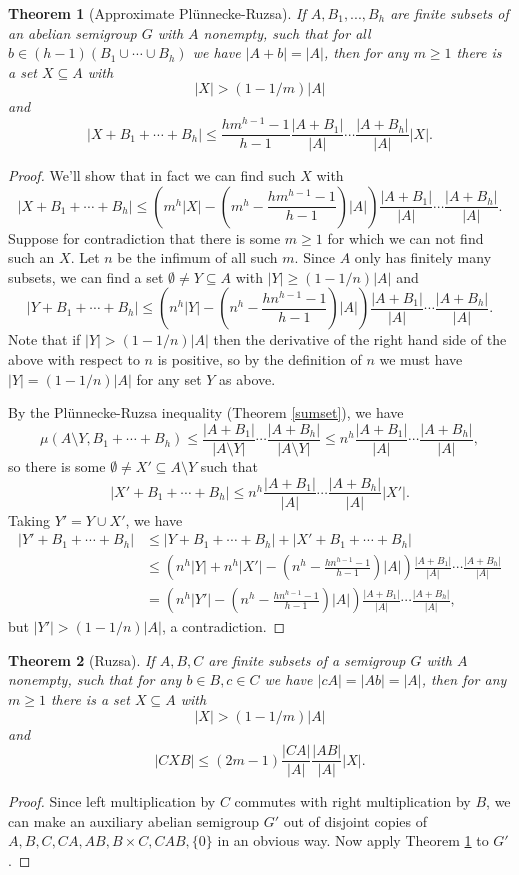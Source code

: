 \documentclass[letterpaper,11pt]{article}
\newtheorem{thm}{Theorem}
\theoremstyle{definition}
\theoremstyle{remark}
\begin{document}
\begin{thm}[Approximate Pl\"unnecke-Ruzsa]\label{approx-pr} If $A,B_1, ..., B_h$ are finite subsets of an abelian semigroup $G$ with $A$ nonempty, such that for all $b \in (h-1)(B_1\cup\cdots\cup B_h)$ we have $|A+b| = |A|$, then for any $m \ge 1$ there is a set $X \subseteq A$ with
\[
|X| > (1-1/m)|A|
\]
and
\[
|X+B_1+\cdots +B_h| \le \frac{hm^{h-1}-1}{h-1}\frac{|A+B_1|}{|A|}\cdots\frac{|A+B_h|}{|A|}|X|.
\]
\end{thm}
\begin{proof} We'll show that in fact we can find such $X$ with
\[
|X+B_1+\cdots +B_h| \le \left(m^h|X|-\left(m^h-\frac{hm^{h-1}-1}{h-1}\right)|A|\right)\frac{|A+B_1|}{|A|}\cdots\frac{|A+B_h|}{|A|}.
\]
Suppose for contradiction that there is some $m \ge 1$ for which we can not find such an $X$. Let $n$ be the infimum of all such $m$. Since $A$ only has finitely many subsets, we can find a set $\emptyset \ne Y\subseteq A$ with $|Y| \ge (1-1/n)|A|$ and
\[
|Y+B_1+\cdots +B_h| \le \left(n^h|Y|-\left(n^h-\frac{hn^{h-1}-1}{h-1}\right)|A|\right)\frac{|A+B_1|}{|A|}\cdots\frac{|A+B_h|}{|A|}.
\]
Note that if $|Y| > (1-1/n)|A|$ then the derivative of the right hand side of the above with respect to $n$ is positive, so by the definition of $n$ we must have $|Y| = (1-1/n)|A|$ for any set $Y$ as above.

By the Pl\"unnecke-Ruzsa inequality (Theorem \ref{sumset}), we have
\[
\mu(A\setminus Y,B_1+\cdots +B_h) \le \frac{|A+B_1|}{|A\setminus Y|}\cdots\frac{|A+B_h|}{|A\setminus Y|} \le n^h\frac{|A+B_1|}{|A|}\cdots\frac{|A+B_h|}{|A|},
\]
so there is some $\emptyset \ne X'\subseteq A\setminus Y$ such that
\[
|X'+B_1+\cdots +B_h| \le n^h\frac{|A+B_1|}{|A|}\cdots\frac{|A+B_h|}{|A|}|X'|.
\]
Taking $Y' = Y\cup X'$, we have
\begin{align*}
|Y'+B_1+\cdots +B_h| &\le |Y+B_1+\cdots +B_h|+|X'+B_1+\cdots +B_h|\\
&\le \left(n^h|Y|+n^h|X'|-\left(n^h-\frac{hn^{h-1}-1}{h-1}\right)|A|\right)\frac{|A+B_1|}{|A|}\cdots\frac{|A+B_h|}{|A|}\\
&= \left(n^h|Y'|-\left(n^h-\frac{hn^{h-1}-1}{h-1}\right)|A|\right)\frac{|A+B_1|}{|A|}\cdots\frac{|A+B_h|}{|A|},
\end{align*}
but $|Y'| > (1-1/n)|A|$, a contradiction.
\end{proof}

\begin{thm}[Ruzsa]\label{approx-noncommute} If $A,B,C$ are finite subsets of a semigroup $G$ with $A$ nonempty, such that for any $b\in B, c\in C$ we have $|cA| = |Ab| = |A|$, then for any $m \ge 1$ there is a set $X \subseteq A$ with
\[
|X| > (1-1/m)|A|
\]
and
\[
|CXB| \le (2m-1)\frac{|CA|}{|A|}\frac{|AB|}{|A|}|X|.
\]
\end{thm}
\begin{proof} Since left multiplication by $C$ commutes with right multiplication by $B$, we can make an auxiliary abelian semigroup $G'$ out of disjoint copies of $A,B,C,CA,AB,B\times C,CAB,\{0\}$ in an obvious way. Now apply Theorem \ref{approx-pr} to $G'$.
\end{proof}
\end{document}
